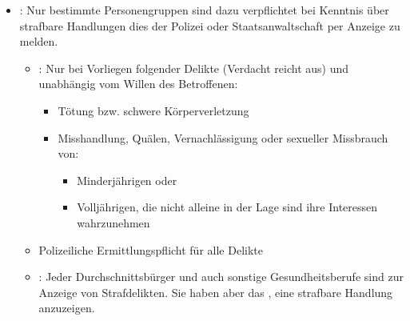 {\begin{itemize}
{\begin{itemize}
   Befürchtung, dass sich die Krankheit weiterverbreiten
   würde oder sich der Patient einer Heilbehandlung
   entziehen würde.
   \item {}:  Meldepflicht
   erst ab manifester Erkrankung mit AIDS (=~bei sichtbaren
   Krankheitszeichen; nicht schon bei HIV-Infektion) oder
   Todesfall mit erkennbaren AIDS typischen
   Krankheiten\footnote{s.
   }.
   Es gibt  Untersuchungs- oder Behandlungspflicht,
   daher darf kein behördlicher Zwang ausgeübt werden. 
   \item
   nach  des Gesundheitsministerium:
   Da sich ständig neue übertragbare Krankheiten\footnote{in
   letzter Zeit z.\,B.
   , , 
   ()} entwickeln, gibt das
   Gesundheitsministerium in unregelmäßigen  Abständen
   Verordnungen heraus, die eine Meldepflicht beinhalten.
  \end{itemize}
  
  Nicht jeder Durchschnittsbürger ist zur Meldung
  verpflichtet, sondern nur besondere Personengruppen,
  worunter aber alle Gesundheitsberufe fallen.
  
  Die Meldung hat an die zuständige
   (in Wien an die MA\,15), bei AIDS an das Bundesministerium für
  Gesundheit, zu ergehen.
  }
  \item {}:\label{topic:anzeigepflicht}
  Nur bestimmte Personengruppen sind dazu verpflichtet bei Kenntnis über
  strafbare Handlungen dies der Polizei oder Staatsanwaltschaft per
  Anzeige zu melden.
  
  \begin{itemize}
    \item {}:
    Nur bei Vorliegen folgender Delikte (Verdacht reicht aus) und
    unabhängig vom Willen des Betroffenen:
    \begin{itemize}
      \item Tötung bzw. schwere Körperverletzung
      \item Misshandlung, Quälen, Vernachlässigung oder
      sexueller Missbrauch
      von:
      \begin{itemize}
        \item Minderjährigen oder
        \item Volljährigen, die nicht alleine in der Lage
        sind ihre Interessen
        wahrzunehmen
      \end{itemize}
    \end{itemize}
    \item Polizeiliche Ermittlungspflicht
    für alle Delikte
  \item {}:
  \label{topic:anzeigerecht}
  Jeder Durchschnittsbürger und auch sonstige Gesundheitsberufe sind
   zur Anzeige von Strafdelikten. Sie
  haben aber das
  , eine strafbare Handlung anzuzeigen.
  

\end{itemize}
\end{itemize}}
